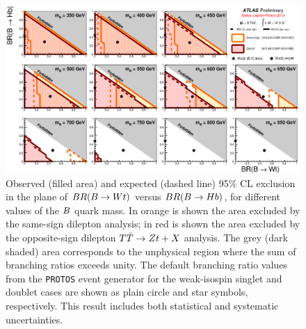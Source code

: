 \begin{landscape}
\begin{figure}[h!bt]
\centering
\includegraphics[width=1.5\textwidth]{results/figures/ATLAS_VLQ_BB_june2013_step2.eps}
\caption{
Observed (filled area) and expected (dashed line) 95\% CL exclusion in the plane of
$BR(\B \to Wt)$ versus $BR(\B \to Hb)$, for different values of the $\B$ quark mass.
In orange is shown the area excluded by the same-sign dilepton analysis;
in red is shown the area excluded by the opposite-sign dilepton $\TTbar\to Zt+X$ analysis.
The grey (dark shaded) area corresponds to the unphysical region where the sum of branching ratios exceeds unity. 
The default branching ratio values from the \texttt{PROTOS} event generator for the weak-isospin singlet and doublet cases 
are shown as plain circle and star symbols, respectively. This result includes both statistical and systematic uncertainties.
\label{fig:limits2D_allvlb}}
\end{figure}
\end{landscape}

